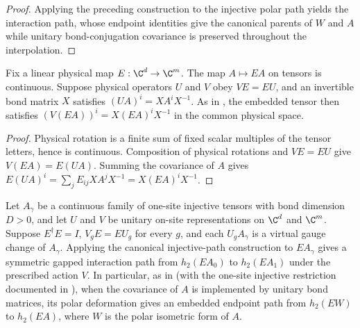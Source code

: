 \begin{proof}\leanok
    Applying the preceding construction to the injective polar path yields
    the interaction path, whose endpoint identities give the canonical
    parents of $W$ and $A$ while unitary bond-conjugation covariance is
    preserved throughout the interpolation.
\end{proof}

\begin{lemma}
    \label{thm:spt_embedding_covariance}
    \leanok
    Fix a linear physical map $E:\C^d\to\C^m$.
    The map $A\mapsto EA$ on tensors is continuous.
    Suppose physical operators $U$ and $V$ obey $VE=EU$, and an
    invertible bond matrix $X$ satisfies $(UA)^i=XA^iX^{-1}$.
    As in \cite[Section~II.F.2]{Schuch2011Phases}, the embedded tensor then
    satisfies $(V(EA))^i=X(EA)^iX^{-1}$ in the common physical space.
\end{lemma}

\begin{proof}\leanok
    Physical rotation is a finite sum of fixed scalar multiples of the
    tensor letters, hence is continuous. Composition of physical rotations
    and $VE=EU$ give $V(EA)=E(UA)$. Summing the covariance of $A$
    gives $E(UA)^i=\sum_jE_{ij}XA^jX^{-1}=X(EA)^iX^{-1}$.
\end{proof}

\begin{definition}
    \label{def:spt_embedded_injective_path}
    \leanok
    Let $A_\gamma$ be a continuous family of one-site injective tensors
    with bond dimension $D>0$, and let $U$ and $V$ be unitary on-site
    representations on $\C^d$ and $\C^m$.
    Suppose $E^\dagger E=I$, $V_gE=EU_g$ for every $g$, and each
    $U_gA_\gamma$ is a virtual gauge change of $A_\gamma$.
    Applying the canonical injective-path construction to $EA_\gamma$
    gives a symmetric gapped interaction path from $h_2(EA_0)$ to
    $h_2(EA_1)$ under the prescribed action $V$.
    In particular, as in \cite[Sections~II.C and II.F.2]{Schuch2011Phases}
    (with the one-site injective restriction documented in
    \cite{gap:spc11_uniform_gap_injective_scope}), when the covariance of
    $A$ is implemented by unitary bond matrices, its polar deformation gives
    an embedded endpoint path from $h_2(EW)$ to $h_2(EA)$, where $W$ is the
    polar isometric form of $A$.
\end{definition}

